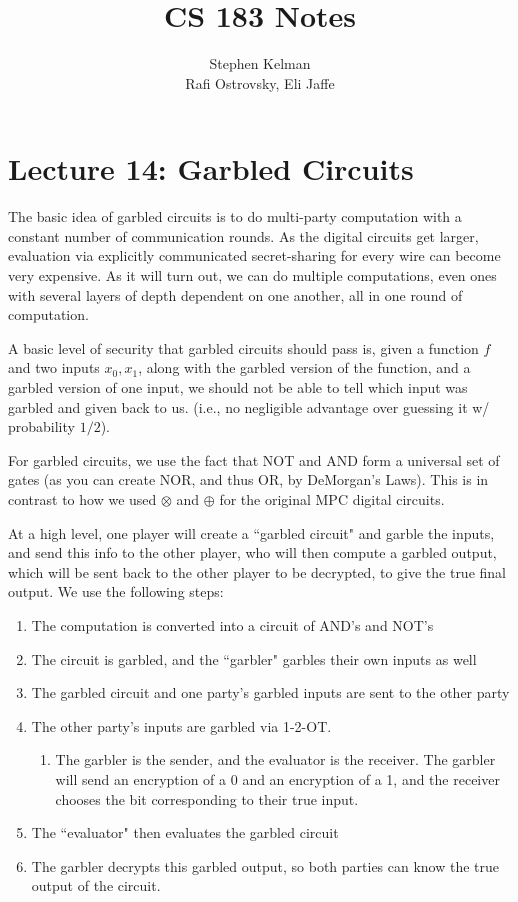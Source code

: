 \documentclass[11pt]{article}
\title{CS 183 Notes}
\author{Stephen Kelman\\ Rafi Ostrovsky, Eli Jaffe}
\begin{document}
\section{Lecture 14: Garbled Circuits}
The basic idea of garbled circuits is to do multi-party computation with a constant number of communication rounds.
As the digital circuits get larger, evaluation via explicitly communicated secret-sharing for every wire can become very expensive.
As it will turn out, we can do multiple computations, even ones with several layers of depth dependent on one another, all in one round of computation.

A basic level of security that garbled circuits should pass is, given a function \(f\) and two inputs \(x_0,x_1\), along with the garbled version of the function, and a garbled version of one input, we should not be able to tell which input was garbled and given back to us. (i.e., no negligible advantage over guessing it w/ probability \(1/2\)).\smallskip

For garbled circuits, we use the fact that NOT and AND form a universal set of gates (as you can create NOR, and thus OR, by DeMorgan's Laws).
This is in contrast to how we used \(\otimes\) and \(\oplus\) for the original MPC digital circuits.

At a high level, one player will create a ``garbled circuit" and garble the inputs, and send this info to the other player, who will then compute a garbled output,
which will be sent back to the other player to be decrypted, to give the true final output.
We use the following steps:
\begin{enumerate}
\item The computation is converted into a circuit of AND's and NOT's
\item The circuit is garbled, and the ``garbler" garbles their own inputs as well
\item The garbled circuit and one party's garbled inputs are sent to the other party
\item The other party's inputs are garbled via 1-2-OT. 
\begin{enumerate}
\item The garbler is the sender, and the evaluator is the receiver. The garbler will send an encryption of a 0 and an encryption of a 1, and the receiver chooses the bit corresponding to their true input.
\end{enumerate}
\item The ``evaluator" then evaluates the garbled circuit
\item The garbler decrypts this garbled output, so both parties can know the true output of the circuit.
\end{enumerate}
\end{document}
